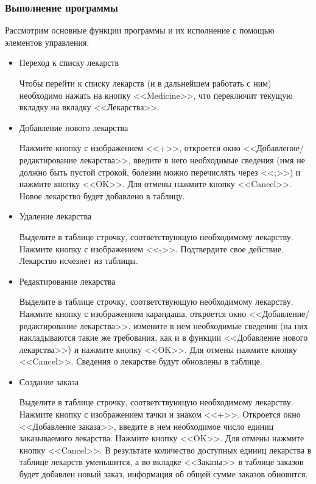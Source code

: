 \subsubsection{Выполнение программы}

Рассмотрим основные функции программы и их исполнение с помощью элементов
управления.
\begin{itemize}
    \item Переход к списку лекарств

        Чтобы перейти к списку лекарств (и в дальнейшем работать с ним)
        необходимо нажать на кнопку <<Medicine>>, что переключит текущую
        вкладку на вкладку <<Лекарства>>.

    \item Добавление нового лекарства

        Нажмите кнопку с изображением <<+>>, откроется окно
        <<Добавление/редактирование лекарства>>, введите в него необходимые
        сведения (имя не должно быть пустой строкой, болезни можно перечислять
        через <<;>>) и нажмите кнопку <<OK>>. Для отмены нажмите кнопку
        <<Cancel>>. Новое лекарство будет добавлено в таблицу.

    \item Удаление лекарства

        Выделите в таблице строчку, соответствующую необходимому лекарству.
        Нажмите кнопку с изображением <<->>. Подтвердите свое действие.
        Лекарство исчезнет из таблицы.

    \item Редактирование лекарства

        Выделите в таблице строчку, соответствующую необходимому лекарству.
        Нажмите кнопку с изображением карандаша, откроется окно
        <<Добавление/редактирование лекарства>>, измените в нем необходимые
        сведения (на них накладываются такие же требования, как и в функции
        <<Добавление нового лекарства>>) и нажмите кнопку <<OK>>. Для отмены
        нажмите кнопку <<Cancel>>. Сведения о лекарстве будут обновлены в
        таблице.

    \item Создание заказа

        Выделите в таблице строчку, соответствующую необходимому лекарству.
        Нажмите кнопку с изображением тачки и знаком <<+>>. Откроется окно
        <<Добавление заказа>>, введите в нем необходимое число единиц
        заказываемого лекарства. Нажмите кнопку <<OK>>. Для отмены нажмите
        кнопку <<Cancel>>. В результате количество доступных единиц лекарства в
        таблице лекарств уменьшится, а во вкладке <<Заказы>> в таблице заказов
        будет добавлен новый заказ, информация об общей сумме заказов
        обновится.


\end{itemize}
